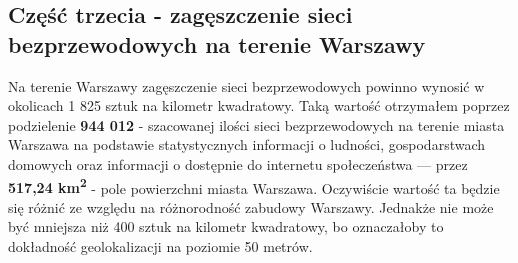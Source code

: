 \subsection{Część trzecia - zagęszczenie sieci bezprzewodowych na terenie Warszawy}
Na terenie Warszawy zagęszczenie sieci bezprzewodowych powinno wynosić w okolicach 1 825 sztuk na kilometr kwadratowy. Taką wartość otrzymałem poprzez podzielenie \textbf{944 012} - szacowanej ilości sieci bezprzewodowych na terenie miasta Warszawa na podstawie statystycznych informacji o ludności, gospodarstwach domowych oraz informacji o dostępnie do internetu społeczeństwa — przez \textbf{517,24 km\textsuperscript{2}} - pole powierzchni miasta Warszawa. Oczywiście wartość ta będzie się różnić ze względu na różnorodność zabudowy Warszawy. Jednakże nie może być mniejsza niż 400 sztuk na kilometr kwadratowy, bo oznaczałoby to dokładność geolokalizacji na poziomie 50 metrów.
